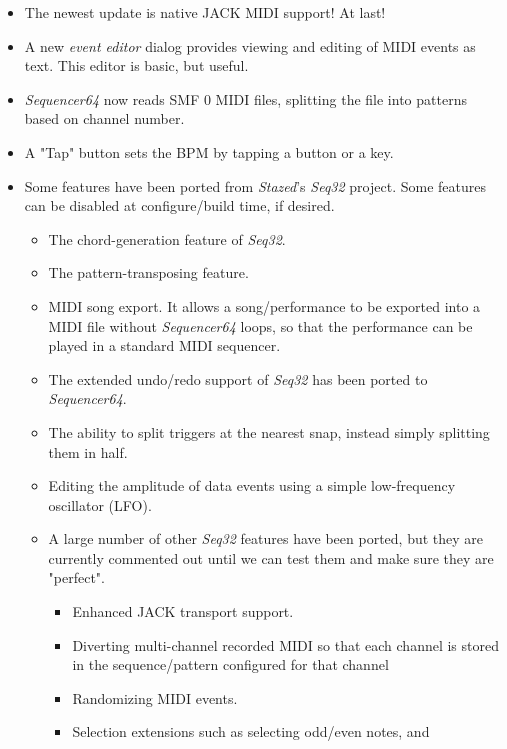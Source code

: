 \documentclass[
 11pt,
 twoside,
 a4paper,
 headinclude,
 footinclude,
 final                                 %
]{article}
\begin{document}
   \begin{itemize}
      \item The newest update is native JACK MIDI support!  At last!
      \item A new \textsl{event editor} dialog
         provides viewing and editing of MIDI events as text.
         This editor is basic, but useful.
      \item \textsl{Sequencer64} now reads SMF 0 MIDI files, splitting
         the file into patterns based on channel number.
      \item A "Tap" button sets the BPM by tapping a button or a key.
      \item Some features have been ported from \textsl{Stazed}'s
      \textsl{Seq32} \cite{seq32} project.  Some features can be disabled at
      configure/build time, if desired.
      \begin{itemize}
         \item The chord-generation feature of \textsl{Seq32}.
         \item The pattern-transposing feature.
         \item MIDI song export.
            It allows a song/performance to be exported into a MIDI file
            without \textsl{Sequencer64} loops, so that the performance can be
            played in a standard MIDI sequencer.
         \item The extended undo/redo support of \textsl{Seq32} has been
            ported to \textsl{Sequencer64}.
         \item The ability to split triggers at the nearest snap, instead
            simply splitting them in half.
         \item Editing the amplitude of data events using a simple
            low-frequency oscillator (LFO).
         \item A large number of other \textsl{Seq32} features have been
            ported, but they are currently commented out until we can test them
            and make sure they are "perfect".
         \begin{itemize}
            \item Enhanced JACK transport support.
            \item Diverting multi-channel recorded MIDI so that each channel
               is stored in the sequence/pattern configured for that channel
            \item Randomizing MIDI events.
            \item Selection extensions such as selecting odd/even notes, and

\end{itemize}
\end{itemize}
\end{itemize}
\end{document}
